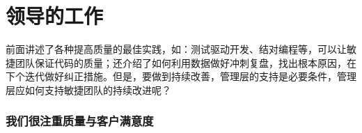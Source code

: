 \chapter{领导的工作} %

前面讲述了各种提高质量的最佳实践，如：测试驱动开发、结对编程等，可以让敏捷团队保证代码的质量；还介绍了如何利用数据做好冲刺复盘，找出根本原因，在下个迭代做好纠正措施。但是，要做到持续改善，管理层的支持是必要条件，管理层应如何支持敏捷团队的持续改进呢？\\

\hypertarget{ux6211ux4eecux5f88ux6ce8ux91cdux8d28ux91cfux4e0eux5ba2ux6237ux6ee1ux610fux5ea6}{%
\subsection{我们很注重质量与客户满意度}\label{ux6211ux4eecux5f88ux6ce8ux91cdux8d28ux91cfux4e0eux5ba2ux6237ux6ee1ux610fux5ea6}}

